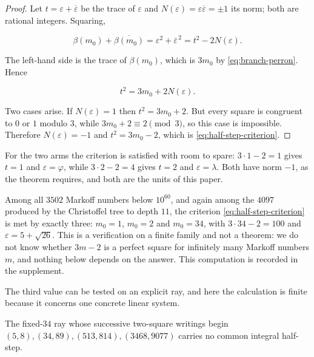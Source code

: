 \begin{proof}
Let $t=\varepsilon+\overline\varepsilon$ be the trace of $\varepsilon$ and
$N(\varepsilon)=\varepsilon\overline\varepsilon=\pm1$ its norm; both are
rational integers. Squaring,

\begin{equation}
 \beta(m_0)+\overline{\beta(m_0)}
 =\varepsilon^2+\overline\varepsilon^{\,2}
 =t^2-2N(\varepsilon).
\end{equation}

The left-hand side is the trace of $\beta(m_0)$, which is $3m_0$ by
\cref{eq:branch-perron}. Hence

\begin{equation}
 t^2=3m_0+2N(\varepsilon).
\end{equation}

Two cases arise. If $N(\varepsilon)=1$ then $t^2=3m_0+2$. But every square is
congruent to $0$ or $1$ modulo $3$, while $3m_0+2\equiv2\pmod3$, so this case
is impossible. Therefore $N(\varepsilon)=-1$ and $t^2=3m_0-2$, which is
\cref{eq:half-step-criterion}.
\end{proof}

For the two arms the criterion is satisfied with room to spare:
$3\cdot1-2=1$ gives $t=1$ and $\varepsilon=\varphi$, while
$3\cdot2-2=4$ gives $t=2$ and $\varepsilon=\lambda$. Both have norm $-1$, as
the theorem requires, and both are the units of this paper.

\begin{remark}
\label{rem:half-step-scan}
Among all $3502$ Markoff numbers below $10^{60}$, and again among the
$4097$ produced by the Christoffel tree to depth $11$, the criterion
\cref{eq:half-step-criterion} is met by exactly three: $m_0=1$, $m_0=2$ and
$m_0=34$, with $3\cdot34-2=100$ and $\varepsilon=5+\sqrt{26}$. This is a
verification on a finite family and not a theorem: we do not know whether
$3m-2$ is a perfect square for infinitely many Markoff numbers $m$, and
nothing below depends on the answer. This computation is recorded in the
supplement.
\end{remark}

The third value can be tested on an explicit ray, and here the calculation is
finite because it concerns one concrete linear system.

\begin{proposition}
\label{prop:no-half-step-34}
The fixed-$34$ ray whose successive two-square writings begin
$(5,8),(34,89),(513,814),(3468,9077)$ carries no common integral half-step.
\end{proposition}


